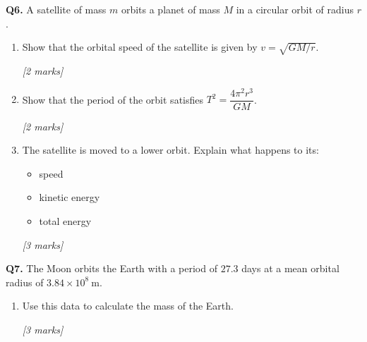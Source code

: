 \begin{tcolorbox}[colback=white, colframe=midblue, breakable]

\begin{minipage}{\linewidth}
\textbf{Q6.} A satellite of mass $m$ orbits a planet of mass $M$ in a circular orbit of radius $r$.
\end{minipage}

\begin{enumerate}[label=(\alph*)]
  \item \begin{minipage}[t]{\linewidth}
  Show that the orbital speed of the satellite is given by $v = \sqrt{GM/r}$.
  \par\hfill\textit{[2 marks]}
  \vspace{3.5cm}
  \end{minipage}

  \item \begin{minipage}[t]{\linewidth}
  Show that the period of the orbit satisfies $T^2 = \dfrac{4\pi^2 r^3}{GM}$.
  \par\hfill\textit{[2 marks]}
  \vspace{3.5cm}
  \end{minipage}

  \item \begin{minipage}[t]{\linewidth}
  The satellite is moved to a lower orbit. Explain what happens to its:
  \begin{itemize}
    \item speed
    \item kinetic energy
    \item total energy
  \end{itemize}
  \par\hfill\textit{[3 marks]}
  \vspace{4cm}
  \end{minipage}
\end{enumerate}

\begin{minipage}{\linewidth}
\textbf{Q7.} The Moon orbits the Earth with a period of $27.3$ days at a mean orbital radius of $3.84\times10^8\ \text{m}$.

\begin{enumerate}[label=(\alph*)]
  \item Use this data to calculate the mass of the Earth.
  \par\hfill\textit{[3 marks]}
  \vspace{4cm}


\end{enumerate}
\end{minipage}
\end{tcolorbox}
